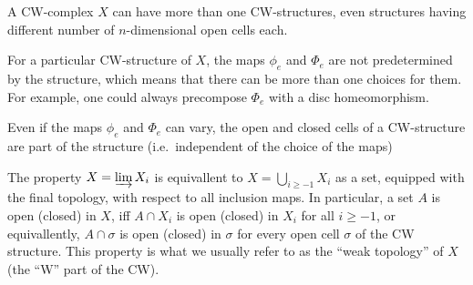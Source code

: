 \begin{notes}
\begin{i_enum}
\item A CW-complex $X$ can have more than one CW-structures, even structures having different number of $n$-dimensional open cells each.
\item For a particular CW-structure of $X$, the maps $\phi_e$ and $\Phi_e$ are not predetermined by the structure, which means that there can be more than one choices for them. For example, one could always precompose $\Phi_e$ with a disc homeomorphism.
\item Even if the maps $\phi_e$ and $\Phi_e$ can vary, the open and closed cells of a CW-structure are part of the structure (i.e.\ independent of the choice of the maps)
\end{i_enum} \end{notes}

\begin{remarks}
\begin{i_enum}
\item The property $X=\varinjlim X_i$ is equivallent to $X=\bigcup_{i\geq-1}X_i$ as a set, equipped with the final topology, with respect to all inclusion maps. In particular, a set $A$ is open (closed) in $X$, iff $A\cap X_i$ is open (closed) in $X_i$ for all $i\geq-1$, or equivallently, $A\cap\sigma$ is open (closed) in $\sigma$ for every open cell $\sigma$ of the CW structure. This property is what we usually refer to as the ``weak topology'' of $X$ (the ``W'' part of the CW).
\item 
\end{i_enum}
\end{remarks}
